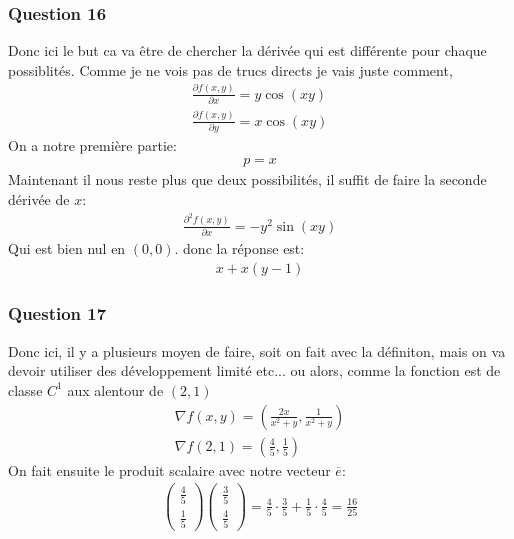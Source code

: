 \documentclass[a4paper]{article}
\begin{document}
\subsubsection{Question 16}
Donc ici le but ca va être de chercher la dérivée qui est différente pour chaque possiblités. Comme je ne vois pas de trucs directs je vais juste comment, 
\begin{align*} 
    \frac{\partial f\left(x, y\right)}{\partial x} = y\cos\left(xy\right)\\
    \frac{\partial f\left(x, y\right)}{\partial y} =  x \cos \left(xy\right) 
\end{align*}
On a notre première partie:
\begin{align*} 
    p = x
\end{align*}
Maintenant il nous reste plus que deux possibilités, il suffit de faire la seconde dérivée de $x$:
\begin{align*} 
    \frac{\partial^2 f\left(x, y\right)}{\partial x} = -y^2\sin\left(xy\right) 
\end{align*}
Qui est bien nul en $\left(0, 0\right)$. donc la réponse est:
\begin{align*} x + x\left(y-1\right)  \end{align*}



\subsubsection{Question 17}
Donc ici, il y a plusieurs moyen de faire, soit on fait avec la définiton, mais on va devoir utiliser des développement limité etc... ou alors, comme la fonction est de classe $C^1$ aux alentour de $\left(2, 1\right)$\\
\begin{align*} 
    \nabla f \left(x, y\right)= \left(\frac{2x}{x^2 + y}, \frac{1}{x^2 + y}\right)\\
    \nabla f \left(2, 1\right) =  \left(\frac{4}{5}, \frac{1}{5}\right)
\end{align*}
On fait ensuite le produit scalaire avec notre vecteur $\overline{e}$:
\begin{align*} 
    \begin{pmatrix} \frac{4}{5} \\ \frac{1}{5} \end{pmatrix} \begin{pmatrix} \frac{3}{5} \\ \frac{4}{5} \end{pmatrix}  = \frac{4}{5}\cdot  \frac{3}{5} + \frac{1}{5}\cdot \frac{4}{5} = \frac{16}{25}
\end{align*}
\end{document}
